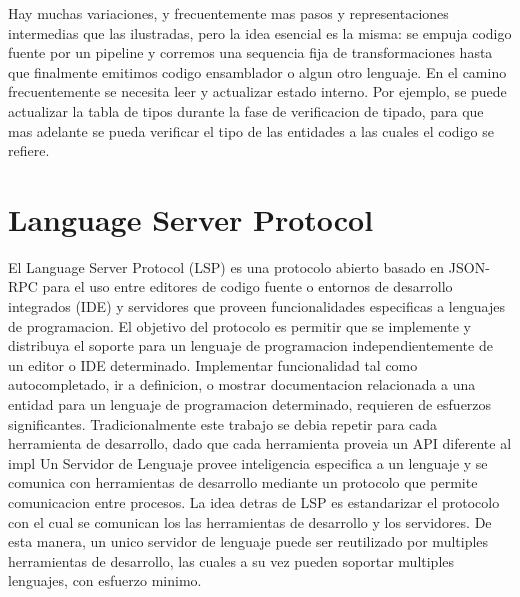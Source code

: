 \documentclass[12pt, a4paper]{report}
\begin{document}
    Hay muchas variaciones, y frecuentemente mas pasos y representaciones intermedias que las ilustradas, pero la idea esencial es la misma: se empuja codigo fuente por un pipeline y corremos una sequencia fija de transformaciones hasta que finalmente emitimos codigo ensamblador o algun otro lenguaje.
    En el camino frecuentemente se necesita leer y actualizar estado interno.
    Por ejemplo, se puede actualizar la tabla de tipos durante la fase de verificacion de tipado, para que mas adelante se pueda verificar el tipo de las entidades a las cuales el codigo se refiere.
    \cite{olle_query_based}

  \section*{Language Server Protocol}

    El Language Server Protocol (LSP) es una protocolo abierto basado en JSON-RPC para el uso entre editores de codigo fuente o entornos de desarrollo integrados (IDE) y servidores que proveen funcionalidades especificas a lenguajes de programacion.
    El objetivo del protocolo es permitir que se implemente y distribuya el soporte para un lenguaje de programacion independientemente de un editor o IDE determinado.
    Implementar funcionalidad tal como autocompletado, ir a definicion, o mostrar documentacion relacionada a una entidad para un lenguaje de programacion determinado, requieren de esfuerzos significantes.
    Tradicionalmente este trabajo se debia repetir para cada herramienta de desarrollo, dado que cada herramienta proveia un API diferente al impl
    Un Servidor de Lenguaje provee inteligencia especifica a un lenguaje y se comunica con herramientas de desarrollo mediante un protocolo que permite comunicacion entre procesos.
    La idea detras de LSP es estandarizar el protocolo con el cual se comunican los las herramientas de desarrollo y los servidores. De esta manera, un unico servidor de lenguaje puede ser reutilizado por multiples herramientas de desarrollo, las cuales a su vez pueden soportar multiples lenguajes, con esfuerzo minimo.
    \cite{language_server_protocol}
\end{document}
